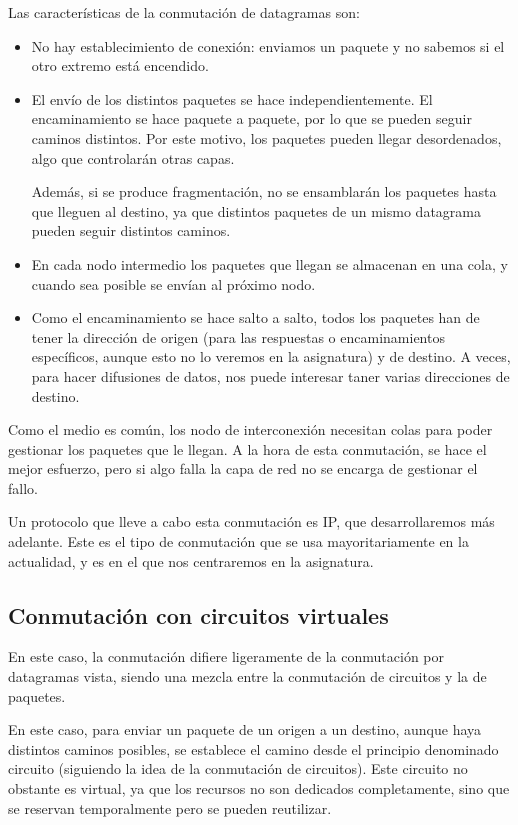 Las características de la conmutación de datagramas son:
\begin{itemize}
    \item No hay establecimiento de conexión: enviamos un paquete y no sabemos si el otro extremo está encendido.
    \item El envío de los distintos paquetes se hace independientemente. El encaminamiento se hace paquete a paquete, por lo que se pueden seguir caminos distintos. Por este motivo, los paquetes pueden llegar desordenados, algo que controlarán otras capas.
    
    Además, si se produce fragmentación, no se ensamblarán los paquetes hasta que lleguen al destino, ya que distintos paquetes de un mismo datagrama pueden seguir distintos caminos. 
    \item En cada nodo intermedio los paquetes que llegan se almacenan en una cola, y cuando sea posible se envían al próximo nodo. 
    \item Como el encaminamiento se hace salto a salto, todos los paquetes han de tener la dirección de origen (para las respuestas o encaminamientos específicos, aunque esto no lo veremos en la asignatura) y de destino. A veces, para hacer difusiones de datos, nos puede interesar taner varias direcciones de destino.
\end{itemize}

Como el medio es común, los nodo de interconexión necesitan colas para poder gestionar los paquetes que le llegan.
A la hora de esta conmutación, se hace el mejor esfuerzo, pero si algo falla la capa de red no se encarga de gestionar el fallo.

Un protocolo que lleve a cabo esta conmutación es \acrshort{IP}, que desarrollaremos más adelante.
Este es el tipo de conmutación que se usa mayoritariamente en la actualidad, y es en el que nos centraremos en la asignatura.

\subsection{Conmutación con circuitos virtuales}

En este caso, la conmutación difiere ligeramente de la conmutación por datagramas vista, siendo una mezcla entre la conmutación de circuitos y la de paquetes.

En este caso, para enviar un paquete de un origen a un destino, aunque haya distintos caminos posibles, se establece el camino desde el principio denominado circuito (siguiendo la idea de la conmutación de circuitos). Este circuito no obstante es virtual, ya que los recursos no son dedicados completamente, sino que se reservan temporalmente pero se pueden reutilizar.


